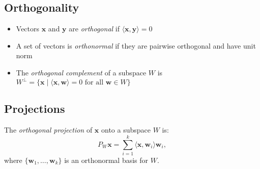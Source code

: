 \subsection{Orthogonality}
\begin{itemize}
    \item Vectors $\mathbf{x}$ and $\mathbf{y}$ are \emph{orthogonal} if $\langle \mathbf{x}, \mathbf{y} \rangle = 0$
    \item A set of vectors is \emph{orthonormal} if they are pairwise orthogonal and have unit norm
    \item The \emph{orthogonal complement} of a subspace $W$ is $W^\perp = \{\mathbf{x} \mid \langle \mathbf{x}, \mathbf{w} \rangle = 0 \text{ for all } \mathbf{w} \in W\}$
\end{itemize}

\subsection{Projections}
The \emph{orthogonal projection} of $\mathbf{x}$ onto a subspace $W$ is:
\[
P_W \mathbf{x} = \sum_{i=1}^k \langle \mathbf{x}, \mathbf{w}_i \rangle \mathbf{w}_i,
\]
where $\{\mathbf{w}_1, \ldots, \mathbf{w}_k\}$ is an orthonormal basis for $W$. 